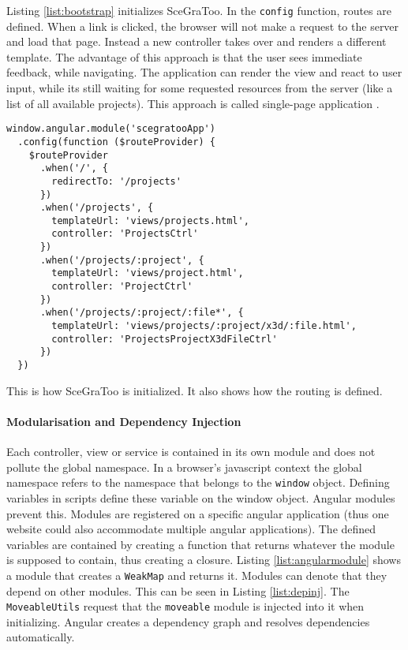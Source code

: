 Listing \ref{list:bootstrap} initializes SceGraToo. In the \texttt{config}
function, routes are defined. When a link is clicked, the browser will not make a
request to the server and load that page. Instead a new controller takes over and
renders a different template. The advantage of this approach is that the user
sees immediate feedback, while navigating. The application can render the view and
react to user input, while its still waiting for some requested resources from
the server (like a list of all available projects). This approach is called
single-page application \cite{Mikowski:2013:SPW:2663433}.

\begin{listing}
  \begin{verbatim}
window.angular.module('scegratooApp')
  .config(function ($routeProvider) {
    $routeProvider
      .when('/', {
        redirectTo: '/projects'
      })
      .when('/projects', {
        templateUrl: 'views/projects.html',
        controller: 'ProjectsCtrl'
      })
      .when('/projects/:project', {
        templateUrl: 'views/project.html',
        controller: 'ProjectCtrl'
      })
      .when('/projects/:project/:file*', {
        templateUrl: 'views/projects/:project/x3d/:file.html',
        controller: 'ProjectsProjectX3dFileCtrl'
      })
  })
  \end{verbatim}
  \caption{This is how \gls{SceGraToo} is initialized. It also shows how the routing is defined.}
  \label{list:bootstrap}
\end{listing}

\paragraph{Modularisation and Dependency Injection}
\label{par:modularisation}

Each controller, view or service is contained in its own module and does not
pollute the global namespace. In a browser's javascript context the global
namespace refers to the namespace that belongs to the \texttt{window} object.
Defining variables in scripts define these variable on the window object.
Angular modules prevent this. Modules are registered on a specific angular
application (thus one website could also accommodate multiple angular
applications). The defined variables are contained by creating a function that
returns whatever the module is supposed to contain, thus creating a closure.
Listing \ref{list:angularmodule} shows a module that creates a \texttt{WeakMap} and
returns it. Modules can denote that they depend on other modules. This can be
seen in Listing \ref{list:depinj}. The \texttt{MoveableUtils} request that the
\texttt{moveable} module is injected into it when initializing. Angular creates
a dependency graph and resolves dependencies automatically.



